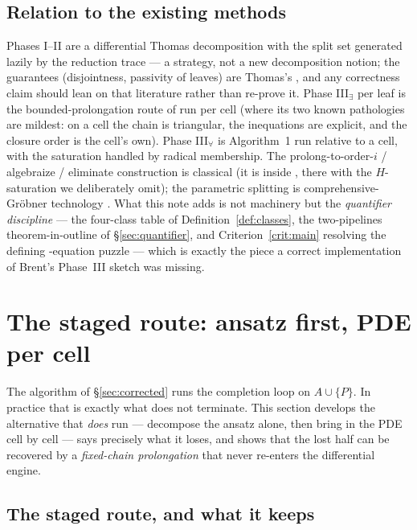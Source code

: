 \documentclass[11pt]{article}
\begin{document}
\subsection{Relation to the existing methods}

Phases I--II are a differential Thomas decomposition with the split set
generated lazily by the reduction trace --- a strategy, not a new
decomposition notion; the guarantees (disjointness, passivity of leaves) are
Thomas's \cite{BGLR2012}, and any correctness claim should lean on that
literature rather than re-prove it. Phase III$_\exists$ per leaf is the
bounded-prolongation route of \cite{bounded-prolongation-note} run per cell
(where its two known pathologies are mildest: on a cell the chain is
triangular, the inequations are explicit, and the closure order is the
cell's own). Phase III$_\forall$ is Algorithm~1 run relative to a cell, with
the saturation handled by radical membership. The prolong-to-order-$i$ /
algebraize / eliminate construction is classical (it is inside
\cite{GKO2009}, there with the $H$-saturation we deliberately omit); the
parametric splitting is comprehensive-Gr\"obner technology
\cite{weispfenning,gerdt-hashemi}. What this note adds is not machinery but
the \emph{quantifier discipline} --- the four-class table of
Definition~\ref{def:classes}, the two-pipelines theorem-in-outline of
\S\ref{sec:quantifier}, and Criterion~\ref{crit:main} resolving the defining%
-equation puzzle --- which is exactly the piece a correct implementation of
Brent's Phase~III sketch was missing.

\section{The staged route: ansatz first, PDE per cell}
\label{sec:staged}

The algorithm of \S\ref{sec:corrected} runs the completion loop on
$A\cup\{P\}$. In practice that is exactly what does not terminate. This
section develops the alternative that \emph{does} run --- decompose the
ansatz alone, then bring in the PDE cell by cell --- says precisely what it
loses, and shows that the lost half can be recovered by a \emph{fixed-chain
prolongation} that never re-enters the differential engine.

\subsection{The staged route, and what it keeps}
\end{document}
